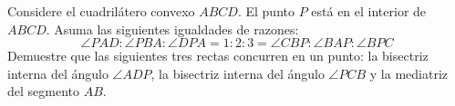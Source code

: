 Considere el cuadrilátero convexo $ABCD$. El punto $P$ está en el interior de $ABCD$. Asuma las siguientes igualdades de razones:
\[\angle PAD:\angle PBA:\angle DPA=1:2:3=\angle CBP:\angle BAP:\angle BPC\]
Demuestre que las siguientes tres rectas concurren en un punto: la bisectriz interna del ángulo 
$\angle ADP$,
la bisectriz interna del ángulo $\angle PCB$ y la mediatriz del segmento $AB$.